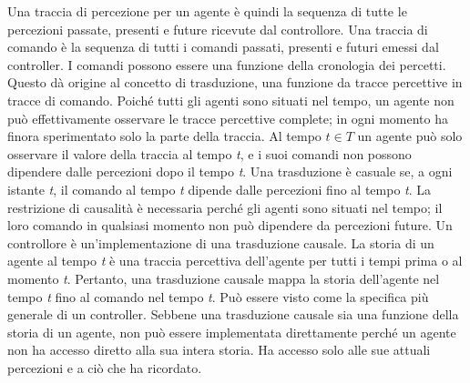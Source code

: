 \documentclass[a4paper]{extarticle}
\begin{document}
Una traccia di percezione per un agente è quindi la sequenza di tutte le percezioni passate, presenti e future ricevute dal controllore. Una traccia di comando è la sequenza di tutti i comandi passati, presenti e futuri emessi dal controller. I comandi possono essere una funzione della cronologia dei percetti. Questo dà origine al concetto di trasduzione, una funzione da tracce percettive in tracce di comando. Poiché tutti gli agenti sono situati nel tempo, un agente non può effettivamente osservare le tracce percettive complete; in ogni momento ha finora sperimentato solo la parte della traccia. Al tempo \textit{$t \in T$} un agente può solo osservare il valore della traccia al tempo \textit{t}, e i suoi comandi non possono dipendere dalle percezioni dopo il tempo \textit{t}. Una trasduzione è casuale se, a ogni istante \textit{t}, il comando al tempo \textit{t} dipende dalle percezioni fino al tempo \textit{t}. La restrizione di causalità è necessaria perché gli agenti sono situati nel tempo; il loro comando in qualsiasi momento non può dipendere da percezioni future. Un controllore è un'implementazione di una trasduzione causale. La storia di un agente al tempo \textit{t} è una traccia percettiva dell'agente per tutti i tempi prima o al momento \textit{t}. Pertanto, una trasduzione causale mappa la storia dell'agente nel tempo \textit{t} fino al comando nel tempo \textit{t}. Può essere visto come la specifica più generale di un controller. Sebbene una trasduzione causale sia una funzione della storia di un agente, non può essere implementata direttamente perché un agente non ha accesso diretto alla sua intera storia. Ha accesso solo alle sue attuali percezioni e a ciò che ha ricordato.
\end{document}
